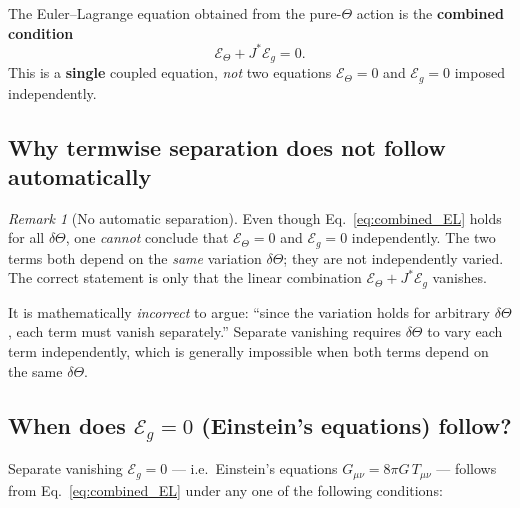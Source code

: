 \documentclass[12pt]{article}
\theoremstyle{definition}
\theoremstyle{remark}
\newtheorem{remark}[theorem]{Remark}
\begin{document}
\begin{tcolorbox}[colback=blue!5!white,colframe=blue!75!black,
                  title=Fundamental Variational Equation of UBT]
The Euler--Lagrange equation obtained from the pure-$\Theta$ action is the
\textbf{combined condition}
\begin{equation}
  \mathcal{E}_\Theta + J^{*}\mathcal{E}_g = 0.
  \tag{$\star$}
  \label{eq:combined_EL}
\end{equation}
This is a \textbf{single} coupled equation, \emph{not} two equations
$\mathcal{E}_\Theta = 0$ and $\mathcal{E}_g = 0$ imposed independently.
\end{tcolorbox}

\subsection{Why termwise separation does not follow automatically}

\begin{remark}[No automatic separation]
\label{rem:no_separation}
Even though Eq.~\eqref{eq:combined_EL} holds for all $\delta\Theta$, one
\emph{cannot} conclude that $\mathcal{E}_\Theta = 0$ and $\mathcal{E}_g = 0$
independently.  The two terms both depend on the \emph{same} variation
$\delta\Theta$; they are not independently varied.  The correct statement is
only that the linear combination $\mathcal{E}_\Theta + J^{*}\mathcal{E}_g$
vanishes.
\end{remark}

\begin{tcolorbox}[colback=yellow!10!white,colframe=orange!80!black,
                  title=Warning: Do Not Assume Independent Termwise Vanishing]
It is mathematically \emph{incorrect} to argue: ``since the variation holds for
arbitrary $\delta\Theta$, each term must vanish separately.''  Separate vanishing
requires $\delta\Theta$ to vary each term independently, which is generally
impossible when both terms depend on the same $\delta\Theta$.
\end{tcolorbox}

\subsection{When does $\mathcal{E}_g = 0$ (Einstein's equations) follow?}
\label{subsec:when_sep}

Separate vanishing $\mathcal{E}_g = 0$ — i.e.\ Einstein's equations
$G_{\mu\nu} = 8\pi G\,T_{\mu\nu}$ — follows from Eq.~\eqref{eq:combined_EL}
under any one of the following conditions:
\end{document}
